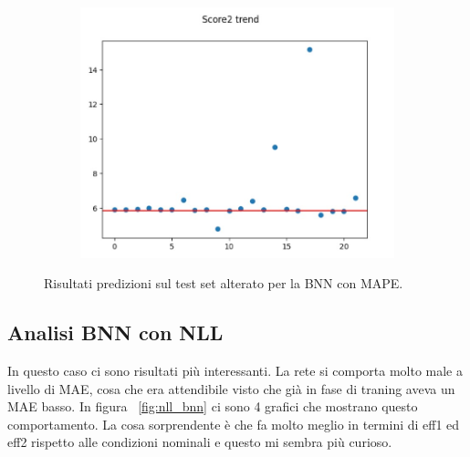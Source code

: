 \documentclass[
	letterpaper,
	a4paper,
	cleardoublepage=empty,
	headings=twolinechapter,
	numbers=autoenddot,
]{article}
\begin{document}
\begin{figure}[h]
\begin{subfigure}{.5\textwidth}
			\caption{}
			\label{fig:mape_bnn_ci}
		\end{subfigure}%
		\begin{subfigure}{.5\textwidth}
			\centering
			\includegraphics[width=0.7\linewidth]{ImageFiles/mape_bnn_eff2}
			\caption{}
			\label{fig:mae_bnn_eff2}
		\end{subfigure}
		\caption{Risultati predizioni sul test set alterato per la BNN con MAPE.}
		\label{fig:mape_bnn}
	\end{figure}
	
	\subsection{Analisi BNN con NLL}
	In questo caso ci sono risultati più interessanti. La rete si comporta molto male a livello di MAE, cosa che era attendibile visto che già in fase di traning aveva un MAE basso. In figura ~\ref{fig:nll_bnn} ci sono 4 grafici che mostrano questo comportamento. La cosa sorprendente è che fa molto meglio in termini di eff1 ed eff2 rispetto alle condizioni nominali e questo mi sembra più curioso.
	
\end{document}
